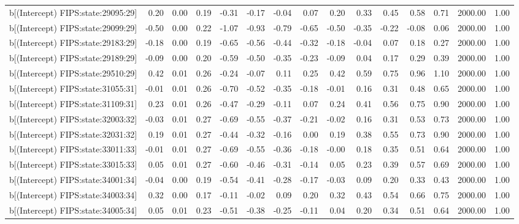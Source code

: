 \begin{table}[ht]
\begin{tabular}{rrrrrrrrrrrrrrr}
  b[(Intercept) FIPS:state:29095:29] & 0.20 & 0.00 & 0.19 & -0.31 & -0.17 & -0.04 & 0.07 & 0.20 & 0.33 & 0.45 & 0.58 & 0.71 & 2000.00 & 1.00 \\ 
  b[(Intercept) FIPS:state:29099:29] & -0.50 & 0.00 & 0.22 & -1.07 & -0.93 & -0.79 & -0.65 & -0.50 & -0.35 & -0.22 & -0.08 & 0.06 & 2000.00 & 1.00 \\ 
  b[(Intercept) FIPS:state:29183:29] & -0.18 & 0.00 & 0.19 & -0.65 & -0.56 & -0.44 & -0.32 & -0.18 & -0.04 & 0.07 & 0.18 & 0.27 & 2000.00 & 1.00 \\ 
  b[(Intercept) FIPS:state:29189:29] & -0.09 & 0.00 & 0.20 & -0.59 & -0.50 & -0.35 & -0.23 & -0.09 & 0.04 & 0.17 & 0.29 & 0.39 & 2000.00 & 1.00 \\ 
  b[(Intercept) FIPS:state:29510:29] & 0.42 & 0.01 & 0.26 & -0.24 & -0.07 & 0.11 & 0.25 & 0.42 & 0.59 & 0.75 & 0.96 & 1.10 & 2000.00 & 1.00 \\ 
  b[(Intercept) FIPS:state:31055:31] & -0.01 & 0.01 & 0.26 & -0.70 & -0.52 & -0.35 & -0.18 & -0.01 & 0.16 & 0.31 & 0.48 & 0.65 & 2000.00 & 1.00 \\ 
  b[(Intercept) FIPS:state:31109:31] & 0.23 & 0.01 & 0.26 & -0.47 & -0.29 & -0.11 & 0.07 & 0.24 & 0.41 & 0.56 & 0.75 & 0.90 & 2000.00 & 1.00 \\ 
  b[(Intercept) FIPS:state:32003:32] & -0.03 & 0.01 & 0.27 & -0.69 & -0.55 & -0.37 & -0.21 & -0.02 & 0.16 & 0.31 & 0.53 & 0.73 & 2000.00 & 1.00 \\ 
  b[(Intercept) FIPS:state:32031:32] & 0.19 & 0.01 & 0.27 & -0.44 & -0.32 & -0.16 & 0.00 & 0.19 & 0.38 & 0.55 & 0.73 & 0.90 & 2000.00 & 1.00 \\ 
  b[(Intercept) FIPS:state:33011:33] & -0.01 & 0.01 & 0.27 & -0.69 & -0.55 & -0.36 & -0.18 & -0.00 & 0.18 & 0.35 & 0.51 & 0.64 & 2000.00 & 1.00 \\ 
  b[(Intercept) FIPS:state:33015:33] & 0.05 & 0.01 & 0.27 & -0.60 & -0.46 & -0.31 & -0.14 & 0.05 & 0.23 & 0.39 & 0.57 & 0.69 & 2000.00 & 1.00 \\ 
  b[(Intercept) FIPS:state:34001:34] & -0.04 & 0.00 & 0.19 & -0.54 & -0.41 & -0.28 & -0.17 & -0.03 & 0.09 & 0.20 & 0.33 & 0.43 & 2000.00 & 1.00 \\ 
  b[(Intercept) FIPS:state:34003:34] & 0.32 & 0.00 & 0.17 & -0.11 & -0.02 & 0.09 & 0.20 & 0.32 & 0.43 & 0.54 & 0.66 & 0.75 & 2000.00 & 1.00 \\ 
  b[(Intercept) FIPS:state:34005:34] & 0.05 & 0.01 & 0.23 & -0.51 & -0.38 & -0.25 & -0.11 & 0.04 & 0.20 & 0.34 & 0.51 & 0.64 & 2000.00 & 1.00 \\ 

\end{tabular}
\end{table}

